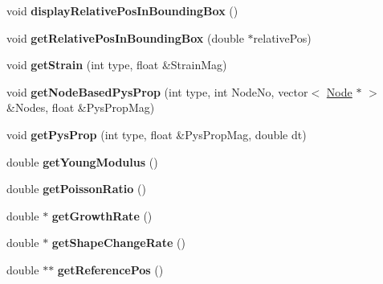 \begin{DoxyCompactItemize}
\item 
\hypertarget{classShapeBase_ae5e17514271f121498ed12cebae3aebe}{}void {\bfseries display\+Relative\+Pos\+In\+Bounding\+Box} ()\label{classShapeBase_ae5e17514271f121498ed12cebae3aebe}

\item 
\hypertarget{classShapeBase_a0d33afa938cd84b1376806a06769f6b9}{}void {\bfseries get\+Relative\+Pos\+In\+Bounding\+Box} (double $\ast$relative\+Pos)\label{classShapeBase_a0d33afa938cd84b1376806a06769f6b9}

\item 
\hypertarget{classShapeBase_aecf99016ea7c36e0bff43a40e6a89df3}{}void {\bfseries get\+Strain} (int type, float \&Strain\+Mag)\label{classShapeBase_aecf99016ea7c36e0bff43a40e6a89df3}

\item 
\hypertarget{classShapeBase_ac1368b84a5ed722fa7b9f82656b49969}{}void {\bfseries get\+Node\+Based\+Pys\+Prop} (int type, int Node\+No, vector$<$ \hyperlink{classNode}{Node} $\ast$ $>$ \&Nodes, float \&Pys\+Prop\+Mag)\label{classShapeBase_ac1368b84a5ed722fa7b9f82656b49969}

\item 
\hypertarget{classShapeBase_abff91451c3465778ed89624d6196f7f6}{}void {\bfseries get\+Pys\+Prop} (int type, float \&Pys\+Prop\+Mag, double dt)\label{classShapeBase_abff91451c3465778ed89624d6196f7f6}

\item 
\hypertarget{classShapeBase_ade96ff86461eaabce716e83fa68bfa19}{}double {\bfseries get\+Young\+Modulus} ()\label{classShapeBase_ade96ff86461eaabce716e83fa68bfa19}

\item 
\hypertarget{classShapeBase_a01140f17779cd2e990c9f28e3c86b77e}{}double {\bfseries get\+Poisson\+Ratio} ()\label{classShapeBase_a01140f17779cd2e990c9f28e3c86b77e}

\item 
\hypertarget{classShapeBase_a94b472ab0c5242226313cd096e17a3fe}{}double $\ast$ {\bfseries get\+Growth\+Rate} ()\label{classShapeBase_a94b472ab0c5242226313cd096e17a3fe}

\item 
\hypertarget{classShapeBase_a6f4d5556ac05b897919f49dacd0f8101}{}double $\ast$ {\bfseries get\+Shape\+Change\+Rate} ()\label{classShapeBase_a6f4d5556ac05b897919f49dacd0f8101}

\item 
\hypertarget{classShapeBase_a91ba74cc41917dbe821159023f1bf1ec}{}double $\ast$$\ast$ {\bfseries get\+Reference\+Pos} ()\label{classShapeBase_a91ba74cc41917dbe821159023f1bf1ec}


\end{DoxyCompactItemize}
